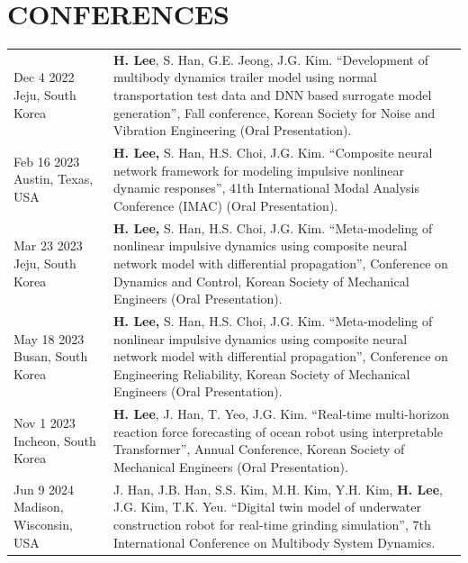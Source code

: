 \documentclass[a4paper,10pt]{extarticle}
\begin{document}
\section*{CONFERENCES}
\noindent
{}
\vspace*{-.5cm}
\begin{longtable}{LR}
    {Dec 4 2022 \linebreak Jeju, South Korea}    & \textbf{H. Lee}, S. Han, G.E. Jeong, J.G. Kim. “Development of multibody dynamics trailer model using normal transportation test data and DNN based surrogate model generation”, Fall conference, Korean Society for Noise and Vibration Engineering (Oral Presentation). \\
    {Feb 16 2023 \linebreak  Austin, Texas, USA} & \textbf{H. Lee,} S. Han, H.S. Choi, J.G. Kim. “Composite neural network framework for modeling impulsive nonlinear dynamic responses”, 41th International Modal Analysis Conference (IMAC) (Oral Presentation).                                                                  \\
    {Mar 23 2023 \linebreak Jeju, South Korea}   & \textbf{H. Lee,} S. Han, H.S. Choi, J.G. Kim. “Meta-modeling of nonlinear impulsive dynamics using composite neural network model with differential propagation”, Conference on Dynamics and Control, Korean Society of Mechanical Engineers (Oral Presentation).         \\
    {May 18 2023 \linebreak Busan, South Korea}  & \textbf{H. Lee,} S. Han, H.S. Choi, J.G. Kim. “Meta-modeling of nonlinear impulsive dynamics using composite neural network model with differential propagation”, Conference on Engineering Reliability, Korean Society of Mechanical Engineers (Oral Presentation).      \\
    {Nov 1 2023 \linebreak Incheon, South Korea} & \textbf{H. Lee}, J. Han, T. Yeo, J.G. Kim. “Real-time multi-horizon reaction force forecasting of ocean robot using interpretable Transformer”, Annual Conference, Korean Society of Mechanical Engineers (Oral Presentation).                                            \\
    {Jun 9 2024 \linebreak Madison, Wisconsin, USA}         & J. Han, J.B. Han, S.S. Kim, M.H. Kim, Y.H. Kim, \textbf{H. Lee}, J.G. Kim, T.K. Yeu. “Digital twin model of underwater construction robot for real-time grinding simulation”, 7th International Conference on Multibody System Dynamics.                             \\
\end{longtable}
\end{document}
